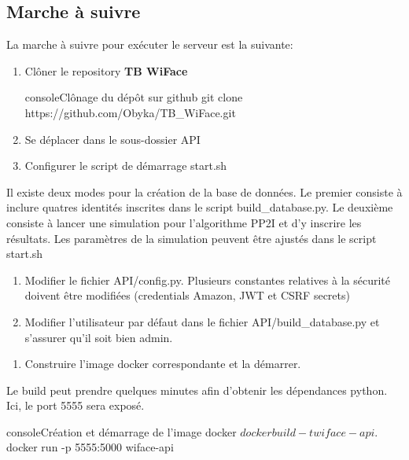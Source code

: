 \subsection{Marche à suivre}
La marche à suivre pour exécuter le serveur est la suivante:
\begin{enumerate}
    \item Clôner le repository \textbf{TB WiFace}
    \begin{listingsbox}{console}{Clônage du dépôt sur github}
git clone https://github.com/Obyka/TB_WiFace.git
    \end{listingsbox}
    \item{Se déplacer dans le sous-dossier API}
    \item{Configurer le script de démarrage start.sh}
\end{enumerate}
    Il existe deux modes pour la création de la base de données. Le premier
    consiste à inclure quatres identités inscrites dans le script build\_database.py.
    Le deuxième consiste à lancer une simulation pour l'algorithme PP2I et d'y inscrire les résultats.
    Les paramètres de la simulation peuvent être ajustés dans le script start.sh
    
    
\begin{enumerate}[resume]
    \item Modifier le fichier API/config.py. Plusieurs constantes relatives à la sécurité doivent être modifiées (credentials Amazon, JWT et CSRF secrets)
    \item Modifier l'utilisateur par défaut dans le fichier API/build\_database.py et s'assurer qu'il soit bien admin.
\end{enumerate}

\begin{enumerate}[resume]
    \item Construire l'image docker correspondante et la démarrer.
\end{enumerate}

Le build peut prendre quelques minutes afin d'obtenir les dépendances python.
Ici, le port 5555 sera exposé.
\begin{listingsbox}{console}{Création et démarrage de l'image docker}
$ docker build -t wiface-api .
$ docker run -p 5555:5000 wiface-api
\end{listingsbox}

